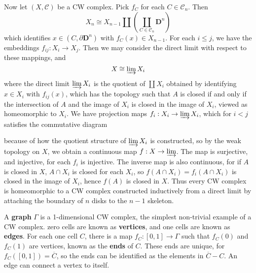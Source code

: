 Now let $(X,\mathcal{C})$ be a CW complex. Pick $f_C$ for each $C \in \mathcal{C}_n$. Then
%
\[ X_n \cong X_{n-1} \coprod \left( \coprod_{C \in \mathcal{C}_n} \mathbf{D}^n \right)  \]
%
which identifies $x \in (C,\partial \mathbf{D}^n)$ with $f_C(x) \in X_{n-1}$. For each $i \leq j$, we have the embeddings $f_{ij}: X_i \to X_j$. Then we may consider the direct limit with respect to these mappings, and
%
\[ X \cong \varinjlim X_i \]
%
where the direct limit $\varinjlim X_i$ is the quotient of $\coprod X_i$ obtained by identifying $x \in X_i$ with $f_{ij}(x)$, which has the topology such that $A$ is closed if and only if the intersection of $A$ and the image of $X_i$ is closed in the image of $X_i$, viewed as homeomorphic to $X_i$. We have projection maps $f_i: X_i \to \varinjlim X_i$, which for $i < j$ satisfies the commutative diagram
%
\begin{center}
\end{center}
%
because of how the quotient structure of $\varinjlim X_i$ is constructed, so by the weak topology on $X$, we obtain a continuous map $f: X \to \varinjlim$. The map is surjective, and injective, for each $f_i$ is injective. The inverse map is also continuous, for if $A$ is closed in $X$, $A \cap X_i$ is closed for each $X_i$, so $f(A \cap X_i) = f_i(A \cap X_i)$ is closed in the image of $X_i$, hence $f(A)$ is closed in $X$. Thus every CW complex is homeomorphic to a CW complex constructed inductively from a direct limit by attaching the boundary of $n$ disks to the $n-1$ skeleton.

\begin{example}
    A {\bf graph} $\Gamma$ is a 1-dimensional CW complex, the simplest non-trivial example of a CW complex. zero cells are known as {\bf vertices}, and one cells are known as {\bf edges}. For each one cell $C$, there is a map $f_C:[0,1] \to \Gamma$ such that $f_C(0)$ and $f_C(1)$ are vertices, known as the {\bf ends} of $C$. These ends are unique, for $f_C([0,1]) = \overline{C}$, so the ends can be identified as the elements in $\overline{C} - C$. An edge can connect a vertex to itself.
\end{example}

